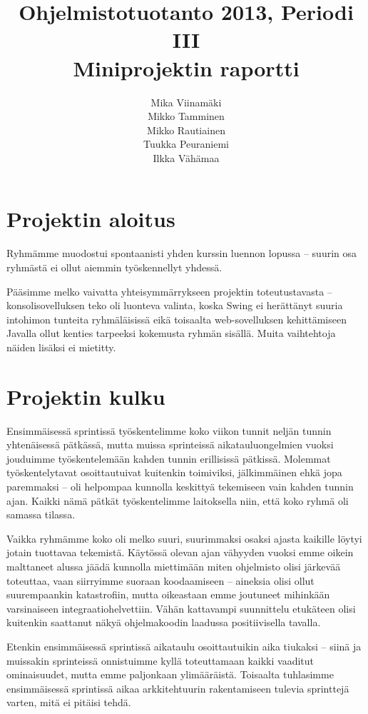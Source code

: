 \documentclass{article}
\title{Ohjelmistotuotanto 2013, Periodi III \\ Miniprojektin raportti}
\author{Mika Viinamäki \\ Mikko Tamminen \\ Mikko Rautiainen \\ Tuukka Peuraniemi \\ Ilkka Vähämaa}
\begin{document}
\begin{titlepage}
\maketitle
\end{titlepage}

\section{Projektin aloitus}

Ryhmämme muodostui spontaanisti yhden kurssin luennon lopussa -- suurin osa ryhmästä ei ollut aiemmin työskennellyt yhdessä.

Pääsimme melko vaivatta yhteisymmärrykseen projektin toteutustavasta -- konsolisovelluksen teko oli luonteva valinta, koska Swing ei herättänyt suuria intohimon tunteita ryhmäläisissä eikä toisaalta web-sovelluksen kehittämiseen Javalla ollut kenties tarpeeksi kokemusta ryhmän sisällä. Muita vaihtehtoja näiden lisäksi ei mietitty.

\section{Projektin kulku}

Ensimmäisessä sprintissä työskentelimme koko viikon tunnit neljän tunnin yhtenäisessä pätkässä, mutta muissa sprinteissä aikatauluongelmien vuoksi jouduimme työskentelemään kahden tunnin erillisissä pätkissä. Molemmat työskentelytavat osoittautuivat kuitenkin toimiviksi, jälkimmäinen ehkä jopa paremmaksi -- oli helpompaa kunnolla keskittyä tekemiseen vain kahden tunnin ajan. Kaikki nämä pätkät työskentelimme laitoksella niin, että koko ryhmä oli samassa tilassa.

Vaikka ryhmämme koko oli melko suuri, suurimmaksi osaksi ajasta kaikille löytyi jotain tuottavaa tekemistä. Käytössä olevan ajan vähyyden vuoksi emme oikein malttaneet alussa jäädä kunnolla miettimään miten ohjelmisto olisi järkevää toteuttaa, vaan siirryimme suoraan koodaamiseen -- aineksia olisi ollut suurempaankin katastrofiin, mutta oikeastaan emme joutuneet mihinkään varsinaiseen integraatiohelvettiin. Vähän kattavampi suunnittelu etukäteen olisi kuitenkin saattanut näkyä ohjelmakoodin laadussa positiivisella tavalla.

Etenkin ensimmäisessä sprintissä aikataulu osoittautuikin aika tiukaksi -- siinä ja muissakin sprinteissä onnistuimme kyllä toteuttamaan kaikki vaaditut ominaisuudet, mutta emme paljonkaan ylimääräistä. Toisaalta tuhlasimme ensimmäisessä sprintissä aikaa arkkitehtuurin rakentamiseen tulevia sprinttejä varten, mitä ei pitäisi tehdä.
\end{document}
